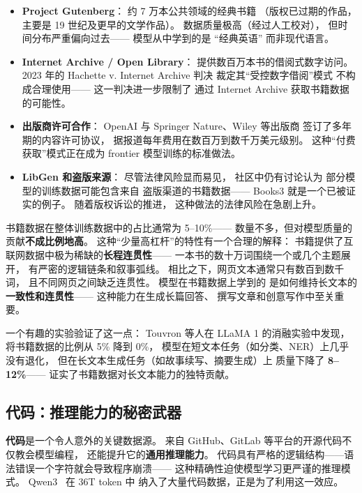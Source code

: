 \begin{itemize}[noitemsep]
  \item \textbf{Project Gutenberg}：
        约 7 万本公共领域的经典书籍
        （版权已过期的作品，主要是 19 世纪及更早的文学作品）。
        数据质量极高（经过人工校对），
        但时间分布严重偏向过去——
        模型从中学到的是 ``经典英语'' 而非现代语言。
  \item \textbf{Internet Archive / Open Library}：
        提供数百万本书的借阅式数字访问。
        2023 年的 Hachette v. Internet Archive 判决
        裁定其``受控数字借阅''模式
        不构成合理使用——
        这一判决进一步限制了
        通过 Internet Archive 获取书籍数据的可能性。
  \item \textbf{出版商许可合作}：
        OpenAI 与 Springer Nature、Wiley 等出版商
        签订了多年期的内容许可协议，
        据报道每年费用在数百万到数千万美元级别。
        这种``付费获取''模式正在成为
        frontier 模型训练的标准做法。
  \item \textbf{LibGen 和盗版来源}：
        尽管法律风险显而易见，
        社区中仍有讨论认为
        部分模型的训练数据可能包含来自
        盗版渠道的书籍数据——
        Books3 就是一个已被证实的例子。
        随着版权诉讼的推进，
        这种做法的法律风险在急剧上升。
\end{itemize}

书籍数据在整体训练数据中的占比通常为 5--10\%——
数量不多，但对模型质量的贡献\textbf{不成比例地高}。
这种``少量高杠杆''的特性有一个合理的解释：
书籍提供了互联网数据中极为稀缺的\textbf{长程连贯性}——
一本书的数十万词围绕一个或几个主题展开，
有严密的逻辑链条和叙事弧线。
相比之下，网页文本通常只有数百到数千词，
且不同网页之间缺乏连贯性。
模型在书籍数据上学到的
是如何维持长文本的\textbf{一致性和连贯性}——
这种能力在生成长篇回答、
撰写文章和创意写作中至关重要。

一个有趣的实验验证了这一点：
Touvron 等人在 LLaMA 1 的消融实验中发现，
将书籍数据的比例从 5\% 降到 0\%，
模型在短文本任务（如分类、NER）上几乎没有退化，
但在长文本生成任务（如故事续写、摘要生成）上
质量下降了 \textbf{8--12\%}——
证实了书籍数据对长文本能力的独特贡献。

\subsection{代码：推理能力的秘密武器}

\textbf{代码}是一个令人意外的关键数据源。
来自 GitHub、GitLab 等平台的开源代码不仅教会模型编程，
还能提升它的\textbf{通用推理能力}。
代码具有严格的逻辑结构——语法错误一个字符就会导致程序崩溃——
这种精确性迫使模型学习更严谨的推理模式。
Qwen3~\cite{qwen2025qwen3} 在 36T token 中
纳入了大量代码数据，正是为了利用这一效应。

